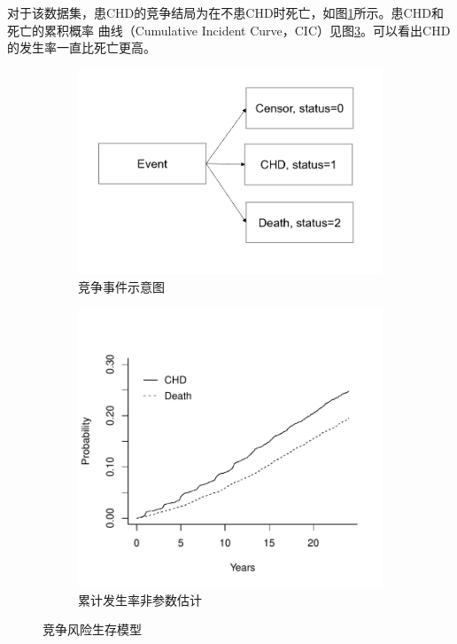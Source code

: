 \documentclass[lang=cn,11pt,a4paper,cite=super,AutoFakeBold]{elegantpaper}
\begin{document}
对于该数据集，患CHD的竞争结局为在不患CHD时死亡，如图\ref{fig:cre}所示。患CHD和死亡的累积概率
曲线（Cumulative Incident Curve，CIC）见图\ref{fig:cic}。可以看出CHD的发生率一直比死亡更高。
\begin{figure}[hbtp]
   \begin{subfigure}[b]{0.49\textwidth}
     \centering
     \includegraphics[width=\linewidth]{img/crevent.PNG}
     \caption{竞争事件示意图}
     \label{fig:cre}
   \end{subfigure}
   \begin{subfigure}[b]{0.49\textwidth}
     \centering
     \includegraphics[width=\linewidth]{img/cic.pdf}  
     \caption{累计发生率非参数估计}
     \label{fig:cic}
   \end{subfigure} 
   \caption{竞争风险生存模型}
\end{figure}
\end{document}
